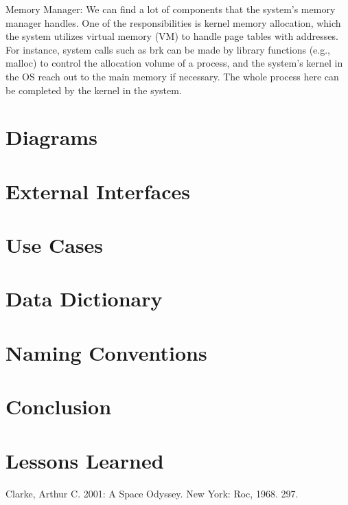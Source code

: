 \documentclass[12pt, dvipsnames, a4paper]{article}
\begin{document}
Memory Manager: We can find a lot of components that the system’s memory manager handles. One of the responsibilities is kernel memory allocation, which the system utilizes virtual memory (VM) to handle page tables with addresses. For instance, system calls such as brk can be made by library functions (e.g., malloc) to control the allocation volume of a process, and the system’s kernel in the OS reach out to the main memory if necessary. The whole process here can be completed by the kernel in the system.\par


\section{Diagrams}
\lipsum[1]

\section{External Interfaces}
\lipsum[1]

\section{Use Cases}
\lipsum[1]

\section{Data Dictionary}
\lipsum[1]

\section{Naming Conventions}
\lipsum[1]

\section{Conclusion}
\lipsum[1]

\section{Lessons Learned}
\lipsum[1]

\begin{thebibliography}{00}
	 Clarke, Arthur C. 2001: A Space Odyssey. New York: Roc, 1968. 297.
\end{thebibliography}
\end{document}
